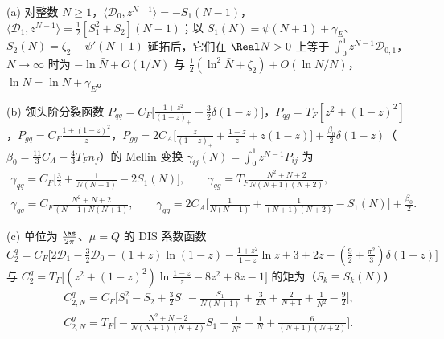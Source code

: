 \begin{lemma}\label{lem:appA-mellin-table}
(a) 对整数 $N\ge1$，$\langle\mathcal D_0,z^{N-1}\rangle=-S_1(N-1)$，$\langle\mathcal D_1,z^{N-1}\rangle=\frac12[S_1^2+S_2](N-1)$；以 $S_1(N)=\psi(N+1)+\gamma_E$、$S_2(N)=\zeta_2-\psi'(N+1)$ 延拓后，它们在 $\Real N>0$ 上等于 $\int_0^1z^{N-1}\mathcal D_{0,1}$，$N\to\infty$ 时为 $-\ln\bar N+O(1/N)$ 与 $\frac12(\ln^2\bar N+\zeta_2)+O(\ln N/N)$，$\ln\bar N=\ln N+\gamma_E$。%
\par
(b) 领头阶分裂函数 $P_{qq}=C_F\big[\frac{1+z^2}{(1-z)_+}+\frac32\delta(1-z)\big]$，$P_{qg}=T_F[z^2+(1-z)^2]$，$P_{gq}=C_F\frac{1+(1-z)^2}z$，$P_{gg}=2C_A\big[\frac z{(1-z)_+}+\frac{1-z}z+z(1-z)\big]+\frac{\beta_0}2\delta(1-z)$（$\beta_0=\frac{11}3C_A-\frac43T_Fn_f$）的 Mellin 变换 $\gamma_{ij}(N)=\int_0^1z^{N-1}P_{ij}$ 为 %
\begin{gather*}
\gamma_{qq}=C_F\Big[\frac32+\frac1{N(N+1)}-2S_1(N)\Big],\qquad \gamma_{qg}=T_F\frac{N^2+N+2}{N(N+1)(N+2)},\\
\gamma_{gq}=C_F\frac{N^2+N+2}{(N-1)N(N+1)},\qquad
\gamma_{gg}=2C_A\Big[\frac1{N(N-1)}+\frac1{(N+1)(N+2)}-S_1(N)\Big]+\frac{\beta_0}2 .
\end{gather*}
\par
(c) 单位为 $\frac{\as}{2\pi}$、$\mu=Q$ 的 DIS 系数函数 $C_2^q=C_F\big[2\mathcal D_1-\frac32\mathcal D_0-(1+z)\ln(1-z)-\frac{1+z^2}{1-z}\ln z+3+2z-(\frac92+\frac{\pi^2}3)\delta(1-z)\big]$ 与 $C_2^g=T_F\big[(z^2+(1-z)^2)\ln\frac{1-z}z-8z^2+8z-1\big]$ 的矩为（$S_k\equiv S_k(N)$）%
\begin{gather*}
C^q_{2,N}=C_F\Big[S_1^2-S_2+\frac32S_1-\frac{S_1}{N(N+1)}+\frac3{2N}+\frac2{N+1}+\frac1{N^2}-\frac92\Big],\\
C^g_{2,N}=T_F\Big[-\frac{N^2+N+2}{N(N+1)(N+2)}S_1+\frac1{N^2}-\frac1N+\frac6{(N+1)(N+2)}\Big].
\end{gather*}
\end{lemma}

